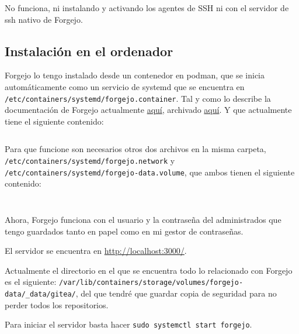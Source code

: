\documentclass{article}
\begin{document}
    No funciona, ni instalando y activando los agentes de SSH ni con el servidor
    de ssh nativo de Forgejo.

    \subsection{Instalación en el ordenador}
    Forgejo lo tengo instalado desde un contenedor en podman, que se inicia automáticamente como
    un servicio de systemd que se encuentra en \texttt{/etc/containers/systemd/forgejo.container}.
    Tal y como lo describe la documentación de Forgejo actualmente \href{https://forgejo.org/docs/latest/admin/installation/docker/}
    {aquí}, archivado \href{https://web.archive.org/web/20260307221713/https://forgejo.org/docs/latest/admin/installation/docker/}
    {aquí}. Y que actualmente tiene el siguiente contenido:

    \inputminted[breaklines, breakanywhere, breaksymbolleft="", breaksymbolright="", breakanywheresymbolpre="", breakanywheresymbolpost=""]
    {systemd}{inc/forgejo.container}

    Para que funcione son necesarios otros dos archivos en la misma carpeta, \texttt{/etc/containers/systemd/forgejo.network}
    y \texttt{/etc/containers/systemd/forgejo-data.volume}, que ambos tienen el siguiente contenido:

    \inputminted[breaklines, breakanywhere, breaksymbolleft="", breaksymbolright="", breakanywheresymbolpre="", breakanywheresymbolpost=""]
    {systemd}{inc/forgejo.network}

    \inputminted[breaklines, breakanywhere, breaksymbolleft="", breaksymbolright="", breakanywheresymbolpre="", breakanywheresymbolpost=""]
    {systemd}{inc/forgejo-data.volume}

    Ahora, Forgejo funciona con el usuario y la contraseña del administrados que tengo
    guardados tanto en papel como en mi gestor de contraseñas.

    El servidor se encuentra en \href{http://localhost:3000/}{http://localhost:3000/}.

    Actualmente el directorio en el que se encuentra todo lo relacionado con Forgejo es el siguiente:
    \texttt{/var/lib/containers/storage/volumes/forgejo-data/\_data/gitea/}, del que tendré que
    guardar copia de seguridad para no perder todos los repositorios.

    Para iniciar el servidor basta hacer \texttt{sudo systemctl start forgejo}.
\end{document}
